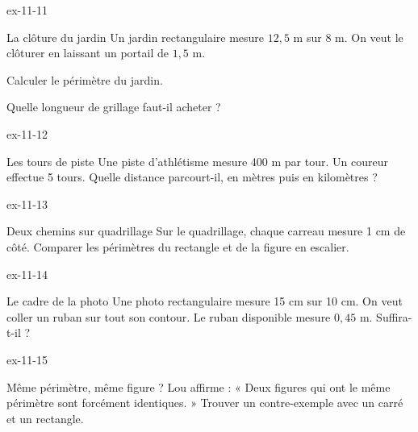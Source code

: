 \begin{blocLivre}{ex-11-11}\begin{exercice}[3]{La clôture du jardin}
Un jardin rectangulaire mesure $12{,}5$ m sur 8 m. On veut le clôturer en laissant un portail de $1{,}5$ m.\begin{questions}
\item Calculer le périmètre du jardin.
\item Quelle longueur de grillage faut-il acheter ?
\end{questions}
\end{exercice}\end{blocLivre}
\begin{blocLivre}{ex-11-12}\begin{exercice}[3]{Les tours de piste}
Une piste d’athlétisme mesure 400 m par tour. Un coureur effectue 5 tours. Quelle distance parcourt-il, en mètres puis en kilomètres ?
\end{exercice}\end{blocLivre}
\begin{blocLivre}{ex-11-13}\begin{exercice}[3]{Deux chemins sur quadrillage}
Sur le quadrillage, chaque carreau mesure 1 cm de côté. Comparer les périmètres du rectangle et de la figure en escalier.
\label{fig-ex-11-13}
\end{exercice}\end{blocLivre}
\begin{blocLivre}{ex-11-14}\begin{exercice}[3]{Le cadre de la photo}
Une photo rectangulaire mesure 15 cm sur 10 cm. On veut coller un ruban sur tout son contour. Le ruban disponible mesure $0{,}45$ m. Suffira-t-il ?
\end{exercice}\end{blocLivre}
\begin{blocLivre}{ex-11-15}\begin{exercice}[3]{Même périmètre, même figure ?}
Lou affirme : « Deux figures qui ont le même périmètre sont forcément identiques. » Trouver un contre-exemple avec un carré et un rectangle.
\end{exercice}\end{blocLivre}

\clearpage
